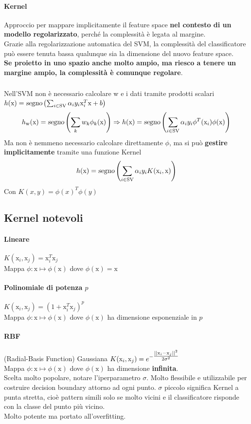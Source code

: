 \documentclass[10pt]{book}
\begin{document}
\paragraph{Kernel} Approccio per mappare implicitamente il feature space \textbf{nel contesto di un modello regolarizzato}, perché la complessità è legata al margine.\\
Grazie alla regolarizzazione automatica del SVM, la complessità del classificatore può essere tenuta bassa qualunque sia la dimensione del nuovo feature space.\\
\textbf{Se proietto in uno spazio anche molto ampio, ma riesco a tenere un margine ampio, la complessità è comunque regolare}.
\subparagraph{} Nell'SVM non è necessario calcolare w e i dati tramite prodotti scalari $h(\text{x}) = \textsl{segno}\left(\sum_{i\in \text{SV}} \alpha_i y_i \text{x}_i^T\text{x} + b \right)$
$$h_\text{w}(\text{x}) = \textsl{segno}\left(\sum_k w_k\phi_k(\text{x})\right) \Rightarrow h(\text{x}) = \textsl{segno}\left(\sum_{i\in \text{SV}} \alpha_i y_i \phi^T(\text{x}_i)\phi(\text{x}) \right)$$
Ma non è nemmeno necessario calcolare direttamente $\phi$, ma si può \textbf{gestire implicitamente} tramite una funzione Kernel
$$h(\text{x}) = \textsl{segno}\left(\sum_{i\in \text{SV}} \alpha_i y_i K(\text{x}_i, \text{x}) \right)$$
Con $K(x, y) = \phi(x)^T\phi(y)$
\subsection{Kernel notevoli}
\paragraph{Lineare} $K(\text{x}_i, \text{x}_j) = \text{x}_i^T\text{x}_j$\\
Mappa $\phi : \text{x} \mapsto \phi(\text{x})$ dove $\phi(\text{x}) = \text{x}$
\paragraph{Polinomiale di potenza $p$} $K(\text{x}_i, \text{x}_j) = (1 + \text{x}_i^T\text{x}_j)^p$\\
Mappa $\phi : \text{x} \mapsto \phi(\text{x})$ dove $\phi(\text{x})$ ha dimensione esponenziale in $p$
\paragraph{RBF} (Radial-Basis Function) Gaussiana $K(\text{x}_i, \text{x}_j) = \mathlarger{e^{-\mathlarger{\frac{||\text{x}_i - \text{x}_j||^2}{2\sigma^2}}}}$\\
Mappa $\phi : \text{x} \mapsto \phi(\text{x})$ dove $\phi(\text{x})$ ha dimensione \textbf{infinita}.\\
Scelta molto popolare, notare l'iperparametro $\sigma$. Molto flessibile e utilizzabile per costruire decision boundary attorno ad ogni punto. $\sigma$ piccolo significa Kernel a punta stretta, cioè pattern simili solo se molto vicini e il classificatore risponde con la classe del punto più vicino.\\
Molto potente ma portato all'overfitting.
\end{document}
